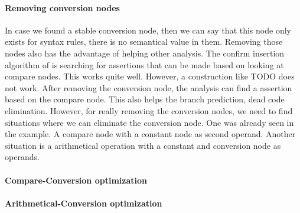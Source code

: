 \paragraph{Removing conversion nodes}
In case we found a stable conversion node, then we can say that this node only exists for syntax rules, there is no semantical value in them. Removing those nodes also has the advantage of helping other analysis. The confirm insertion algorithm of \libFIRM is searching for assertions that can be made based on looking at compare nodes. This works quite well. However, a construction like TODO does not work.
After removing the conversion node, the analysis can find a assertion based on the compare node. This also helps the branch prediction, dead code elimination. \newline
However, for really removing the conversion nodes, we need to find situations where we can eliminate the conversion node. One was already seen in the example. A compare node with a constant node as second operand. Another situation is a arithmetical operation with a constant and conversion node as operands.

\paragraph{Compare-Conversion optimization}
\paragraph{Arithmetical-Conversion optimization}
